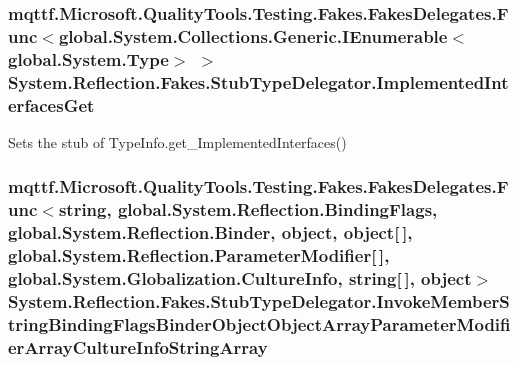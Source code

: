 \hypertarget{class_system_1_1_reflection_1_1_fakes_1_1_stub_type_delegator_a94f62f9cc545dd8c9646ab1ec481b194}{
\subsubsection[{Implemented\-Interfaces\-Get}]{\setlength{\rightskip}{0pt plus 5cm}mqttf.\-Microsoft.\-Quality\-Tools.\-Testing.\-Fakes.\-Fakes\-Delegates.\-Func$<$global.\-System.\-Collections.\-Generic.\-I\-Enumerable$<$global.\-System.\-Type$>$ $>$ System.\-Reflection.\-Fakes.\-Stub\-Type\-Delegator.\-Implemented\-Interfaces\-Get}}\label{class_system_1_1_reflection_1_1_fakes_1_1_stub_type_delegator_a94f62f9cc545dd8c9646ab1ec481b194}


Sets the stub of Type\-Info.\-get\-\_\-\-Implemented\-Interfaces()

\hypertarget{class_system_1_1_reflection_1_1_fakes_1_1_stub_type_delegator_a562cd126dee580474166a625d36366ba}{
\subsubsection[{Invoke\-Member\-String\-Binding\-Flags\-Binder\-Object\-Object\-Array\-Parameter\-Modifier\-Array\-Culture\-Info\-String\-Array}]{\setlength{\rightskip}{0pt plus 5cm}mqttf.\-Microsoft.\-Quality\-Tools.\-Testing.\-Fakes.\-Fakes\-Delegates.\-Func$<$string, global.\-System.\-Reflection.\-Binding\-Flags, global.\-System.\-Reflection.\-Binder, object, object\mbox{[}$\,$\mbox{]}, global.\-System.\-Reflection.\-Parameter\-Modifier\mbox{[}$\,$\mbox{]}, global.\-System.\-Globalization.\-Culture\-Info, string\mbox{[}$\,$\mbox{]}, object$>$ System.\-Reflection.\-Fakes.\-Stub\-Type\-Delegator.\-Invoke\-Member\-String\-Binding\-Flags\-Binder\-Object\-Object\-Array\-Parameter\-Modifier\-Array\-Culture\-Info\-String\-Array}}\label{class_system_1_1_reflection_1_1_fakes_1_1_stub_type_delegator_a562cd126dee580474166a625d36366ba}


